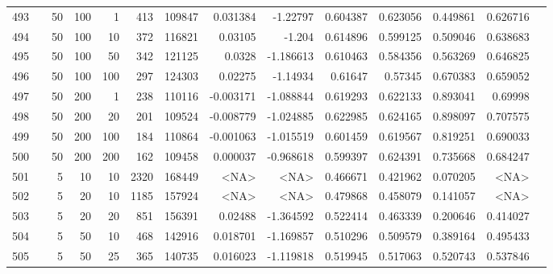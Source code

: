 \begin{longtable}{llrrrrrrrrrrrr}
		493 & &           50 &               100 &            1 &          413 &     109847 &  0.031384 &  -1.22797 &  0.604387 &    0.623056 &       0.449861 &  0.626716 \\
		494 & &           50 &               100 &           10 &          372 &     116821 &   0.03105 &    -1.204 &  0.614896 &    0.599125 &       0.509046 &  0.638683 \\
		495 & &           50 &               100 &           50 &          342 &     121125 &    0.0328 & -1.186613 &  0.610463 &    0.584356 &       0.563269 &  0.646825 \\
		496 & &           50 &               100 &          100 &          297 &     124303 &   0.02275 &  -1.14934 &   0.61647 &     0.57345 &       0.670383 &  0.659052 \\
		497 & &           50 &               200 &            1 &          238 &     110116 & -0.003171 & -1.088844 &  0.619293 &    0.622133 &       0.893041 &   0.69998 \\
		498 & &           50 &               200 &           20 &          201 &     109524 & -0.008779 & -1.024885 &  0.622985 &    0.624165 &       0.898097 &  0.707575 \\
		499 & &           50 &               200 &          100 &          184 &     110864 & -0.001063 & -1.015519 &  0.601459 &    0.619567 &       0.819251 &  0.690033 \\
		500 & &           50 &               200 &          200 &          162 &     109458 &  0.000037 & -0.968618 &  0.599397 &    0.624391 &       0.735668 &  0.684247 \\\midrule
		501 & \multirow[t]{10}{*}{\rotatebox[origin=r]{90}{use-default}} &            5 &                10 &           10 &        2320 &     168449 &      <NA> &      <NA> &  0.466671 &    0.421962 &       0.070205 &  <NA> \\
		502 & &            5 &                20 &           10 &           1185 &     157924 &      <NA> &      <NA> &  0.479868 &    0.458079 &       0.141057 &  <NA> \\
		503 & &            5 &                20 &           20 &         851 &     156391 &   0.02488 & -1.364592 &  0.522414 &    0.463339 &       0.200646 &  0.414027 \\
		504 & &            5 &                50 &           10 &         468 &     142916 &  0.018701 & -1.169857 &  0.510296 &    0.509579 &       0.389164 &  0.495433 \\
		505 & &            5 &                50 &           25 &         365 &     140735 &  0.016023 & -1.119818 &  0.519945 &    0.517063 &       0.520743 &  0.537846 \\

\end{longtable}
